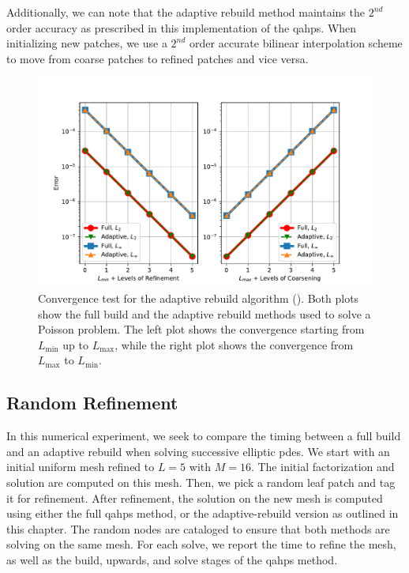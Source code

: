 Additionally, we can note that the adaptive rebuild method maintains the $2^{nd}$ order accuracy as prescribed in this implementation of the \gls{qahps}. When initializing new patches, we use a $2^{nd}$ order accurate bilinear interpolation scheme to move from coarse patches to refined patches and vice versa.

\begin{figure}
    \centering
    \includegraphics[width=\textwidth, clip=true, trim={20 0 40 40}]{figures/full-vs-adaptive-convergence-no-title.pdf}
    \caption{Convergence test for the adaptive rebuild algorithm (). Both plots show the full build and the adaptive rebuild methods used to solve a Poisson problem. The left plot shows the convergence starting from $L_{\text{min}}$ up to $L_{\text{max}}$, while the right plot shows the convergence from $L_{\text{max}}$ to $L_{\text{min}}$.}
    \label{fig:full-vs-adaptive-convergence}
\end{figure}

\subsection{Random Refinement}
\label{sub:random-refinement}

In this numerical experiment, we seek to compare the timing between a full build and an adaptive rebuild when solving successive elliptic \gls{pdes}. We start with an initial uniform mesh refined to $L = 5$ with $M = 16$. The initial factorization and solution are computed on this mesh. Then, we pick a random leaf patch and tag it for refinement. After refinement, the solution on the new mesh is computed using either the full \gls{qahps} method, or the adaptive-rebuild version as outlined in this chapter. The random nodes are cataloged to ensure that both methods are solving on the same mesh. For each solve, we report the time to refine the mesh, as well as the build, upwards, and solve stages of the \gls{qahps} method.

